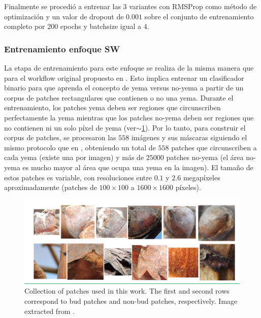 \documentclass[a4paper,authoryear,review]{elsarticle}
\begin{document}
Finalmente se procedió a entrenar las 3 variantes con RMSProp como método de optimización y un valor de dropout de $0.001$ sobre el conjunto de entrenamiento completo por 200 epochs y batchsize igual a 4.

\subsubsection{Entrenamiento enfoque SW} 
\label{sec:swtrain}


La etapa de entrenamiento para este enfoque se realiza de la misma manera que para el workflow original propuesto en \citet{perez2017image}. Esto implica entrenar un clasificador binario para que aprenda el concepto de yema versus no-yema a partir de un corpus de patches rectangulares que contienen o no una yema. Durante el entrenamiento, los patches yema deben ser regiones que circunscriben perfectamente la yema mientras que los  patches no-yema deben ser regiones que no contienen ni un solo píxel de yema (ver$\sim$\ref{fig:Figure2}). Por lo tanto, para construir el corpus de patches, se procesaron las $558$ imágenes y sus máscaras siguiendo el mismo protocolo que en \citet{perez2017image}, obteniendo un total de $558$ patches que circunscriben a cada yema (existe una por imagen) y más de $25000$ patches no-yema (el área no-yema es mucho mayor al área que ocupa una yema en la imagen). El tamaño de estos patches es variable, con resoluciones entre $0.1$ y $2.6$ megapíxeles aproximadamente (patches de $100 \times 100$ a $1600 \times 1600$ píxeles).



\begin{figure}
    \centering
    \includegraphics[width=12cm]{figures/Figure2.png}
    \caption{Collection of patches used in this work. The first and second rows correspond to bud patches and non-bud patches, respectively. Image extracted from \citet{perez2017image}.}
    \label{fig:Figure2}
\end{figure}
\end{document}
